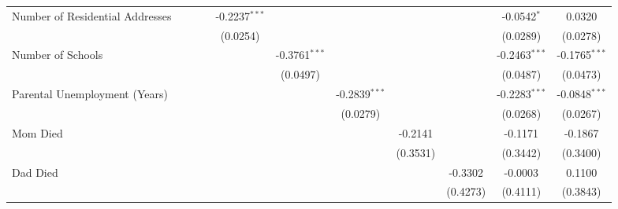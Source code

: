 \begin{tabular}{lcccccccccc}
   Number of Residential Addresses           &                 &                 &                 & -0.2237$^{***}$ &                 &                 &               &                        & -0.0542$^{*}$   & 0.0320\\   
                                             &                 &                 &                 & (0.0254)        &                 &                 &               &                        & (0.0289)        & (0.0278)\\   
   Number of Schools                         &                 &                 &                 &                 & -0.3761$^{***}$ &                 &               &                        & -0.2463$^{***}$ & -0.1765$^{***}$\\   
                                             &                 &                 &                 &                 & (0.0497)        &                 &               &                        & (0.0487)        & (0.0473)\\   
   Parental Unemployment (Years)             &                 &                 &                 &                 &                 & -0.2839$^{***}$ &               &                        & -0.2283$^{***}$ & -0.0848$^{***}$\\   
                                             &                 &                 &                 &                 &                 & (0.0279)        &               &                        & (0.0268)        & (0.0267)\\   
   Mom Died                                  &                 &                 &                 &                 &                 &                 & -0.2141       &                        & -0.1171         & -0.1867\\   
                                             &                 &                 &                 &                 &                 &                 & (0.3531)      &                        & (0.3442)        & (0.3400)\\   
   Dad Died                                  &                 &                 &                 &                 &                 &                 &               & -0.3302                & -0.0003         & 0.1100\\   
                                             &                 &                 &                 &                 &                 &                 &               & (0.4273)               & (0.4111)        & (0.3843)\\   

\end{tabular}
